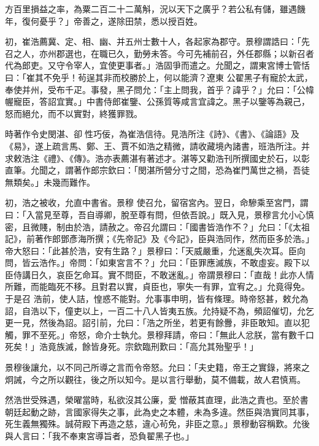 \begin{pinyinscope}
 方百里損益之率，為粟二百二十二萬斛，況以天下之廣乎？若公私有儲，雖遇饑年，復何憂乎？」帝善之，遂除田禁，悉以授百姓。



 初，崔浩薦冀、定、相、幽、并五州士數十人，各起家為郡守。景穆謂誥曰：「先召之人，亦州郡選也，在職已久，勤勞未答。今可先補前召，外任郡縣；以新召者代為郎吏。又守令宰人，宜使更事者。」浩固爭而遣之。允聞之，謂東宮博士管恬曰：「崔其不免乎！茍逞其非而校勝於上，何以能濟？遼東
 公翟黑子有寵於太武，奉使并州，受布千疋。事發，黑子問允：「主上問我，首乎？諱乎？」允曰：「公幃幄寵臣，答詔宜實。」中書侍郎崔鑒、公孫質等咸言宜諱之。黑子以鑒等為親己，怒而絕允，而不以實對，終獲罪戮。



 時著作令史閔湛、卻性巧佞，為崔浩信待。見浩所注《詩》、《書》、《論語》及《易》，遂上疏言馬、鄭、王、賈不如浩之精微，請收藏境內諸書，班浩所注。并求敕浩注《禮》、《傳》。浩亦表薦湛有著述才。湛等又勸浩刊所撰國史於石，以彰直筆。允聞之，謂著作郎宗欽曰：「閔湛所營分寸之間，恐為崔門萬世之禍，吾徒無類矣。」未幾而難作。



 初，浩之被收，允直中書省。景穆
 使召允，留宿宮內。翌日，命驂乘至宮門，謂曰：「入當見至尊，吾自導卿，脫至尊有問，但依吾說。」既入見，景穆言允小心慎密，且微賤，制由於浩，請赦之。帝召允謂曰：「國書皆浩作不？」允曰：「《太祖記》，前著作郎鄧彥海所撰；《先帝記》及《今記》，臣與浩同作，然而臣多於浩。」帝大怒曰：「此甚於浩，安有生路？」景穆曰：「天威嚴重，允迷亂失次耳。臣向問，皆云浩作。」帝問：「如東宮言不？」允曰：「臣罪應滅族，不敢虛妄。殿下以臣侍講日久，哀臣乞命耳。實不問臣，不敢迷亂。」帝謂景穆曰：「直哉！此亦人情所難，而能臨死不移。且對君以實，貞臣也，寧失一有罪，宜宥之。」允竟得免。于是召
 浩前，使人詰，惶惑不能對。允事事申明，皆有條理。時帝怒甚，敕允為詔，自浩以下，僮吏以上，一百二十八人皆夷五族。允持疑不為，頻詔催切，允乞更一見，然後為詔。詔引前，允曰：「浩之所坐，若更有餘釁，非臣敢知。直以犯觸，罪不至死。」帝怒，命介士執允。景穆拜請，帝曰：「無此人忿朕，當有數千口死矣！」浩竟族滅，餘皆身死。宗欽臨刑歎曰：「高允其殆聖乎！」



 景穆後讓允，以不同己所導之言而令帝怒。允曰：「夫史籍，帝王之實錄，將來之炯誡，今之所以觀往，後之所以知今。是以言行舉動，莫不備載，故人君慎焉。



 然浩世受殊遇，榮曜當時，私欲沒其公廉，愛
 憎蔽其直理，此浩之責也。至於書朝廷起動之跡，言國家得失之事，此為史之本體，未為多違。然臣與浩實同其事，死生義無獨殊。誠荷殿下再造之慈，違心茍免，非臣之意。」景穆動容稱歎。允後與人言曰：「我不奉東宮導旨者，恐負翟黑子也。」




\end{pinyinscope}
